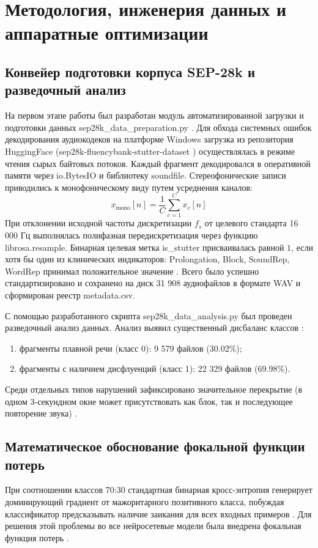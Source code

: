 \documentclass[a4paper,14pt]{extarticle}
\begin{document}
	\newpage
	\section{Методология, инженерия данных и аппаратные оптимизации}
	
	\subsection{Конвейер подготовки корпуса SEP-28k и разведочный анализ}
	На первом этапе работы был разработан модуль автоматизированной загрузки и подготовки данных sep28k\_\allowbreak data\_\allowbreak preparation.py \cite{sep28k}. Для обхода системных ошибок декодирования аудиокодеков на платформе Windows загрузка из репозитория HuggingFace (sep28k-\allowbreak fluencybank-\allowbreak stutter-\allowbreak dataset \cite{sep28k}) осуществлялась в режиме чтения сырых байтовых потоков. Каждый фрагмент декодировался в оперативной памяти через io.BytesIO и библиотеку soundfile. Стереофонические записи приводились к монофоническому виду путем усреднения каналов:
	\begin{equation}
		x_{\text{mono}}[n] = \frac{1}{C} \sum_{c=1}^{C} x_c[n]
	\end{equation}
	При отклонении исходной частоты дискретизации $f_s$ от целевого стандарта 16 000 Гц выполнялась полифазная передискретизация через функцию librosa.\allowbreak resample. Бинарная целевая метка is\_stutter присваивалась равной $1$, если хотя бы один из клинических индикаторов: Prolongation, Block, SoundRep, WordRep принимал положительное значение \cite{sep28k}. Всего было успешно стандартизировано и сохранено на диск 31 908 аудиофайлов в формате WAV и сформирован реестр metadata.csv.
	
	С помощью разработанного скрипта sep28k\_\allowbreak data\_\allowbreak analysis.py был проведен разведочный анализ данных. Анализ выявил существенный дисбаланс классов \cite{sep28k}:
	\begin{enumerate}
		\item фрагменты плавной речи (класс 0): 9 579 файлов (30.02\%);
		\item фрагменты с наличием дисфлуенций (класс 1): 22 329 файлов (69.98\%).
	\end{enumerate}
	Среди отдельных типов нарушений зафиксировано значительное перекрытие (в одном 3-секундном окне может присутствовать как блок, так и последующее повторение звука) \cite{sep28k}.
	
	\subsection{Математическое обоснование фокальной функции потерь}
	При соотношении классов 70:30 стандартная бинарная кросс-энтропия генерирует доминирующий градиент от мажоритарного позитивного класса, побуждая классификатор предсказывать наличие заикания для всех входных примеров \cite{focalloss}. Для решения этой проблемы во все нейросетевые модели была внедрена фокальная функция потерь \cite{focalloss}.
	
\end{document}
